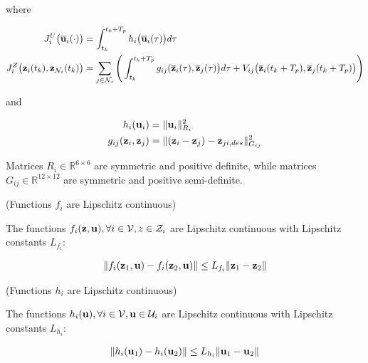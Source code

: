 where

\begin{align}
  J_i^U \big(\overline{\bm{\mathbf{u}}}_i (\cdot)\big) &=
    \int_{t_k}^{t_k + T_p} h_i \big(\overline{\bm{\mathbf{u}}}_i (\tau)\big) d \tau \\
  J_i^Z \big(\bm{\mathbf{z}}_i (t_k), \bm{\mathbf{z}}_{\mathcal{N}_i}(t_k)\big) &=
    \sum_{j \in \mathcal{N}_i} \Bigg(\int_{t_k}^{t_k + T_p} g_{ij} (\overline{\bm{\mathbf{z}}}_i (\tau), \overline{\bm{\mathbf{z}}}_j (\tau)\big) d \tau +
    V_{ij} \big(\overline{\bm{\mathbf{z}}}_i (t_k + T_p), \overline{\bm{\mathbf{z}}}_j (t_k + T_p)\big)\Bigg)
\end{align}

and

\begin{align}
  h_i(\bm{\mathbf{u}}_i) &=\| \bm{\mathbf{u}}_i\|_{R_i}^2 \\
  g_{ij}(\bm{\mathbf{z}}_i, \bm{\mathbf{z}}_j) &= \| (\bm{\mathbf{z}}_i - \bm{\mathbf{z}}_j) - \bm{\mathbf{z}}_{ji,des} \|_{G_{ij}}^2
\end{align}

Matrices $R_i \in \mathbb{R}^{6 \times 6}$ are symmetric and positive
definite, while matrices $G_{ij} \in \mathbb{R}^{12 \times 12}$ are symmetric
and positive semi-definite.

\begin{gg_box}
\begin{assumption} (Functions $f_i$ are Lipschitz continuous)

  The functions $f_i(\bm{\mathbf{z}}, \bm{\mathbf{u}}), \forall i \in \mathcal{V}, z \in \mathcal{Z}_i$
  are Lipschitz continuous with Lipschitz constants $L_{f_i}$:

  \begin{align}
    \| f_i(\bm{\mathbf{z}}_1, \bm{\mathbf{u}}) - f_i(\bm{\mathbf{z}}_2, \bm{\mathbf{u}})\| \leq L_{f_i} \|\bm{\mathbf{z}}_1 - \bm{\mathbf{z}}_2 \|
  \end{align}

  \label{ass:f_i_Lipschitz}
\end{assumption}
\end{gg_box}

\begin{gg_box}
\begin{assumption} (Functions $h_i$ are Lipschitz continuous)

  The functions $h_i(\bm{\mathbf{u}}), \forall i \in \mathcal{V}, \bm{\mathbf{u}} \in \mathcal{U}_i$ are
  Lipschitz continuous with Lipschitz constants $L_{h_i}$:

  \begin{align}
    \| h_i(\bm{\mathbf{u}}_1) - h_i(\bm{\mathbf{u}}_2)\| \leq L_{h_i} \|\bm{\mathbf{u}}_1 - \bm{\mathbf{u}}_2 \|
  \end{align}

  \label{ass:h_i_Lipschitz}
\end{assumption}
\end{gg_box}

